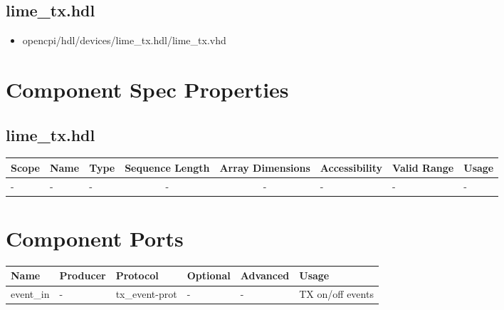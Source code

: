 \documentclass{article}
\def\comp{lime\_tx}
\begin{document}
\subsection*{\comp.hdl}
\begin{itemize}
  \item opencpi/hdl/devices/\comp{}.hdl/\comp{}.vhd
\end{itemize}
\begin{landscape}

  \section*{Component Spec Properties}
  \begin{scriptsize}
  \subsection*{\comp.hdl}
      \begin{tabular}{|p{2cm}|p{2cm}|p{1cm}|c|c|p{1.75cm}|p{1.5cm}|p{7cm}|}
      \hline
      \rowcolor{blue}
      Scope    & Name  				& Type  & Sequence Length 	& Array Dimensions 	& Accessibility & Valid Range 	& Usage \\
      \hline
      - & - & - & - & - & - & - & - \\
      \hline
  \end{tabular}
  \end{scriptsize}

  \section*{Component Ports}
  \begin{scriptsize}
    \begin{tabular}{|p{2cm}|p{1.5cm}|p{4cm}|p{1.5cm}|p{1.5cm}|p{10.85cm}|}
      \hline
      \rowcolor{blue}
      Name 		& Producer & Protocol           & Optional & Advanced & Usage      		\\
      \hline
      event\_in & -        & tx\_event-prot     & -        & -        & TX on/off events\\
      \hline
    \end{tabular}
  \end{scriptsize}


\end{landscape}
\end{document}
